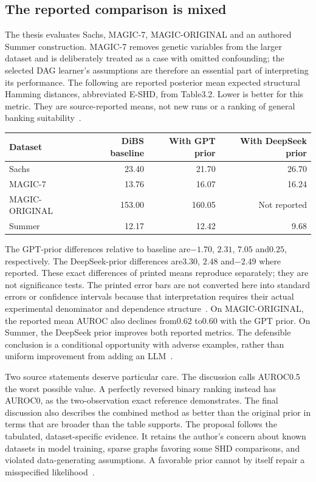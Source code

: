 \subsection{The reported comparison is mixed}
The thesis evaluates Sachs, MAGIC-7, MAGIC-ORIGINAL and an authored Summer construction. MAGIC-7 removes genetic variables from the larger dataset and is deliberately treated as a case with omitted confounding; the selected DAG learner's assumptions are therefore an essential part of interpreting its performance. The following are reported posterior mean expected structural Hamming distances, abbreviated E-SHD, from Table3.2. Lower is better for this metric. They are source-reported means, not new runs or a ranking of general banking suitability~\citep{exec18_videira_thesis}.

\begin{center}
\begin{tabular}{lrrr}
\toprule
Dataset & DiBS baseline & With GPT prior & With DeepSeek prior\\
\midrule
Sachs &23.40&21.70&26.70\\
MAGIC-7 &13.76&16.07&16.24\\
MAGIC-ORIGINAL &153.00&160.05&Not reported\\
Summer &12.17&12.42&9.68\\
\bottomrule
\end{tabular}
\end{center}

The GPT-prior differences relative to baseline are$-1.70$, $2.31$, $7.05$ and$0.25$, respectively. The DeepSeek-prior differences are$3.30$, $2.48$ and$-2.49$ where reported. These exact differences of printed means reproduce separately; they are not significance tests. The printed error bars are not converted here into standard errors or confidence intervals because that interpretation requires their actual experimental denominator and dependence structure~\citep{exec18_bayesian_reference}. On MAGIC-ORIGINAL, the reported mean AUROC also declines from0.62 to0.60 with the GPT prior. On Summer, the DeepSeek prior improves both reported metrics. The defensible conclusion is a conditional opportunity with adverse examples, rather than uniform improvement from adding an LLM~\citep{exec18_videira_thesis}.

Two source statements deserve particular care. The discussion calls AUROC0.5 the worst possible value. A perfectly reversed binary ranking instead has AUROC0, as the two-observation exact reference demonstrates. The final discussion also describes the combined method as better than the original prior in terms that are broader than the table supports. The proposal follows the tabulated, dataset-specific evidence. It retains the author's concern about known datasets in model training, sparse graphs favoring some SHD comparisons, and violated data-generating assumptions. A favorable prior cannot by itself repair a misspecified likelihood~\citep{exec18_videira_thesis,exec18_bayesian_reference}.

